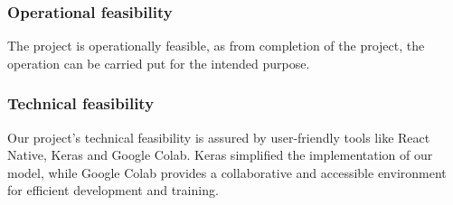 \subsubsection{Operational feasibility}
The project is operationally feasible, as from  completion of the project, the operation can be carried put for the intended purpose.

\subsubsection{Technical feasibility}
Our project's technical feasibility is assured by user-friendly tools like React Native, Keras and Google Colab. Keras simplified the implementation of our model, while Google Colab provides a collaborative and accessible environment for efficient development and training. 

